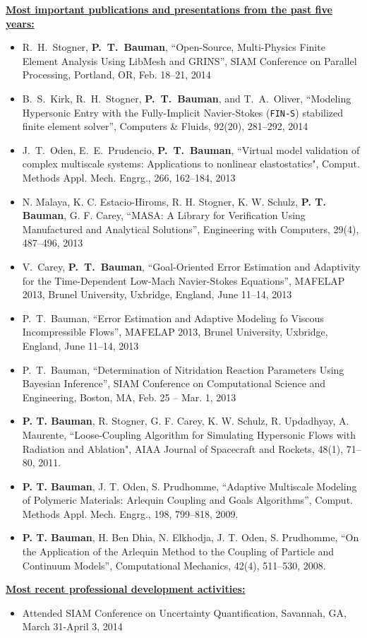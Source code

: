 \documentclass[12pt]{article}
\newcommand{\makesection}[1]{\underline{\bfseries #1:}}
\begin{document}
\makesection{Most important publications and presentations from the past five years}
\begin{itemize}
\item R.~H.~Stogner, \textbf{P.~T.~Bauman},
``Open-Source, Multi-Physics Finite Element Analysis Using LibMesh and GRINS'',
SIAM Conference on Parallel Processing, Portland, OR, Feb. 18--21, 2014
\item B.~S.~Kirk, R.~H.~Stogner, \textbf{P.~T.~Bauman}, and T.~A.~Oliver,
``Modeling Hypersonic Entry with the Fully-Implicit Navier-Stokes (\texttt{FIN-S})
stabilized finite element solver'', Computers \& Fluids, 92(20), 281--292, 2014
\item J.~T.~Oden, E.~E.~Prudencio, \textbf{P.~T.~Bauman},
``Virtual model validation of complex multiscale systems:
Applications to nonlinear elastostatics",
Comput. Methods Appl. Mech. Engrg., 266, 162--184, 2013
\item N. Malaya, K. C. Estacio-Hiroms, R. H. Stogner, K. W. Schulz, \textbf{P. T. Bauman},
G. F. Carey, ``MASA: A Library for Verification Using Manufactured and Analytical Solutions'',
Engineering with Computers, 29(4), 487--496, 2013
\item V.~Carey, \textbf{P.~T.~Bauman},
``Goal-Oriented Error Estimation and Adaptivity for the Time-Dependent Low-Mach Navier-Stokes Equations'',
MAFELAP 2013, Brunel University, Uxbridge, England, June 11--14, 2013
\item P.~T.~Bauman,
``Error Estimation and Adaptive Modeling fo Viscous Incompressible Flows'',
MAFELAP 2013, Brunel University, Uxbridge, England, June 11--14, 2013
\item P.~T.~Bauman,
``Determination of Nitridation Reaction Parameters Using Bayesian Inference'',
SIAM Conference on Computational Science and Engineering, Boston, MA, Feb. 25 -- Mar. 1, 2013
\item \textbf{P. T. Bauman}, R. Stogner, G. F. Carey, K. W. Schulz, R. Updadhyay, A. Maurente, ``Loose-Coupling Algorithm for Simulating
Hypersonic Flows with Radiation and Ablation", AIAA Journal of Spacecraft and Rockets, 48(1), 71--80, 2011.
\item \textbf{P. T. Bauman}, J. T. Oden, S. Prudhomme, ``Adaptive Multiscale Modeling of Polymeric Materials: Arlequin Coupling and Goals Algorithms'', Comput. Methods Appl. Mech. Engrg., 198, 799--818, 2009.
\item \textbf{P. T. Bauman}, H. Ben Dhia, N. Elkhodja, J. T. Oden, S. Prudhomme, ``On the Application of the Arlequin Method to the Coupling of Particle and Continuum Models'', Computational Mechanics, 42(4), 511--530, 2008.
\end{itemize}

\makesection{Most recent professional development activities}
\begin{itemize}
\item Attended SIAM Conference on Uncertainty Quantification, Savannah, GA, March 31-April 3, 2014
\end{itemize}
\end{document}
